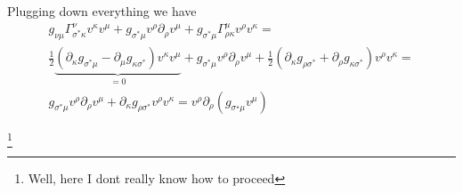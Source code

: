 %
Plugging down everything we have
%
\begin{multline}
    g_{\nu \mu} \Gamma_{\sigma^\ast \kappa}^{\nu} v^\kappa  v^\mu +
    g_{\sigma^\ast \mu}  v^\rho \partial_\rho v^\mu + 
    g_{\sigma^\ast \mu} \Gamma_{\rho \kappa}^{\mu} v^\rho v^\kappa = \\
    \frac{1}{2} \underbrace{(\partial_\kappa g_{{\sigma^\ast}\mu} - 
    \partial_\mu g_{\kappa{\sigma^\ast}}) v^\kappa  v^\mu }_{ = 0} +
    g_{\sigma^\ast \mu}  v^\rho \partial_\rho v^\mu + 
    \frac{1}{2} (\partial_\kappa g_{{\rho}\sigma^\ast} +
    \partial_{\rho} g_{\kappa\sigma^\ast})  v^\rho v^\kappa = \\
    g_{\sigma^\ast \mu}  v^\rho \partial_\rho v^\mu + 
    \partial_\kappa g_{{\rho}\sigma^\ast} v^\rho v^\kappa = 
    v^\rho \partial_\rho \left(g_{\sigma^{\star}\mu}v^\mu\right)
\end{multline}

\footnote{Well, here I dont really know how to proceed}